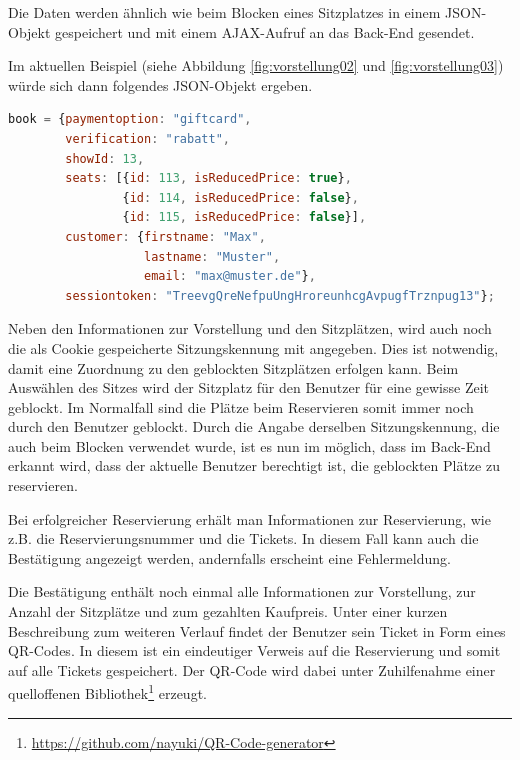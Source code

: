 Die Daten werden ähnlich wie beim Blocken eines Sitzplatzes in einem \acs{JSON}-Objekt gespeichert und mit einem \acs{AJAX}-Aufruf an das Back-End gesendet.

Im aktuellen Beispiel (siehe Abbildung \ref{fig:vorstellung02} und \ref{fig:vorstellung03}) würde sich dann folgendes \acs{JSON}-Objekt ergeben.

\begin{lstlisting}[language=JavaScript, caption={\acs{JSON}-Objekt für den Reservierungsvorgang}, label={lst:json_book}]
book = {paymentoption: "giftcard",
        verification: "rabatt",
        showId: 13,
        seats: [{id: 113, isReducedPrice: true},
                {id: 114, isReducedPrice: false},
                {id: 115, isReducedPrice: false}],
        customer: {firstname: "Max",
                   lastname: "Muster",
                   email: "max@muster.de"},
        sessiontoken: "TreevgQreNefpuUngHroreunhcgAvpugfTrznpug13"};
\end{lstlisting}

Neben den Informationen zur Vorstellung und den Sitzplätzen, wird auch noch die als Cookie gespeicherte Sitzungskennung mit angegeben.
Dies ist notwendig, damit eine Zuordnung zu den geblockten Sitzplätzen erfolgen kann.
Beim Auswählen des Sitzes wird der Sitzplatz für den Benutzer für eine gewisse Zeit geblockt.
Im Normalfall sind die Plätze beim Reservieren somit immer noch durch den Benutzer geblockt.
Durch die Angabe derselben Sitzungskennung, die auch beim Blocken verwendet wurde, ist es nun im möglich, dass im Back-End erkannt wird, dass der aktuelle Benutzer berechtigt ist, die geblockten Plätze zu reservieren.

Bei erfolgreicher Reservierung erhält man Informationen zur Reservierung, wie z.B. die Reservierungsnummer und die Tickets.
In diesem Fall kann auch die Bestätigung angezeigt werden, andernfalls erscheint eine Fehlermeldung.

Die Bestätigung enthält noch einmal alle Informationen zur Vorstellung, zur Anzahl der Sitzplätze und zum gezahlten Kaufpreis.
Unter einer kurzen Beschreibung zum weiteren Verlauf findet der Benutzer sein Ticket in Form eines \acs{QR-Code}s.
In diesem ist ein eindeutiger Verweis auf die Reservierung und somit auf alle Tickets gespeichert.
Der \acs{QR-Code} wird dabei unter Zuhilfenahme einer quelloffenen Bibliothek\footnote{\url{https://github.com/nayuki/QR-Code-generator}} erzeugt.

